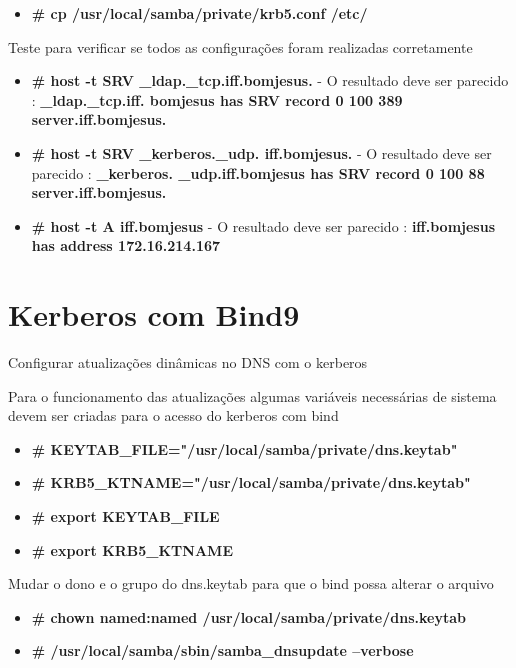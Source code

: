 \begin{itemize}
	\item \textbf{\# cp /usr/local/samba/private/krb5.conf  /etc/}
\end{itemize}

Teste para verificar se todos as configurações foram realizadas corretamente

\begin{itemize}
	\item \textbf{\# host -t SRV \_ldap.\_tcp.iff.bomjesus.} - O resultado deve ser parecido : \textbf{\_ldap.\_tcp.iff. bomjesus has SRV record 0 100 389 server.iff.bomjesus.}
	\item \textbf{\# host -t SRV \_kerberos.\_udp. iff.bomjesus.} - O resultado deve ser parecido : \textbf{\_kerberos. \_udp.iff.bomjesus has SRV record 0 100 88 server.iff.bomjesus.}
	\item \textbf{\# host -t A iff.bomjesus} - O resultado deve ser parecido : \textbf{iff.bomjesus has address 172.16.214.167}
\end{itemize}

\section{Kerberos com Bind9}

Configurar atualizações dinâmicas no DNS com o kerberos

Para o funcionamento das atualizações algumas variáveis necessárias de sistema devem ser criadas para o acesso do kerberos com bind

\begin{itemize}
	\item \textbf{\# KEYTAB\_FILE="/usr/local/samba/private/dns.keytab"}
	\item \textbf{\# KRB5\_KTNAME="/usr/local/samba/private/dns.keytab"}
	\item \textbf{\# export KEYTAB\_FILE}
	\item \textbf{\# export KRB5\_KTNAME}
\end{itemize}

Mudar o dono e o grupo do dns.keytab para que o bind possa alterar o arquivo

\begin{itemize}
	\item \textbf{\# chown named:named /usr/local/samba/private/dns.keytab}
	\item \textbf{\# /usr/local/samba/sbin/samba\_dnsupdate --verbose}
\end{itemize}


